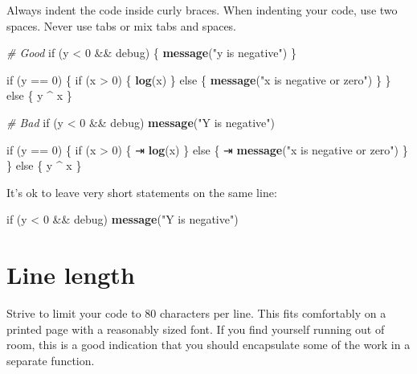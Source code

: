 \documentclass[]{book}
\newenvironment{Shaded}{\begin{snugshade}}{\end{snugshade}}
\newcommand{\KeywordTok}[1]{\textcolor[rgb]{0.13,0.29,0.53}{\textbf{{#1}}}}
\newcommand{\DecValTok}[1]{\textcolor[rgb]{0.00,0.00,0.81}{{#1}}}
\newcommand{\StringTok}[1]{\textcolor[rgb]{0.31,0.60,0.02}{{#1}}}
\newcommand{\CommentTok}[1]{\textcolor[rgb]{0.56,0.35,0.01}{\textit{{#1}}}}
\newcommand{\NormalTok}[1]{{#1}}
\begin{document}
Always indent the code inside curly braces. When indenting your code,
use two spaces. Never use tabs or mix tabs and spaces.

\begin{Shaded}
\begin{Highlighting}[]
\CommentTok{# Good}
\NormalTok{if (y <}\StringTok{ }\DecValTok{0} \NormalTok{&&}\StringTok{ }\NormalTok{debug) \{}
  \KeywordTok{message}\NormalTok{(}\StringTok{"y is negative"}\NormalTok{)}
\NormalTok{\}}

\NormalTok{if (y ==}\StringTok{ }\DecValTok{0}\NormalTok{) \{}
  \NormalTok{if (x >}\StringTok{ }\DecValTok{0}\NormalTok{) \{}
    \KeywordTok{log}\NormalTok{(x)}
  \NormalTok{\} else \{}
    \KeywordTok{message}\NormalTok{(}\StringTok{"x is negative or zero"}\NormalTok{)}
  \NormalTok{\}}
\NormalTok{\} else \{}
  \NormalTok{y ^}\StringTok{ }\NormalTok{x}
\NormalTok{\}}

\CommentTok{# Bad}
\NormalTok{if (y <}\StringTok{ }\DecValTok{0} \NormalTok{&&}\StringTok{ }\NormalTok{debug)}
\KeywordTok{message}\NormalTok{(}\StringTok{"Y is negative"}\NormalTok{)}

\NormalTok{if (y ==}\StringTok{ }\DecValTok{0}\NormalTok{)}
\NormalTok{\{}
    \NormalTok{if (x >}\StringTok{ }\DecValTok{0}\NormalTok{) \{}
\NormalTok{⇥       }\KeywordTok{log}\NormalTok{(x)}
    \NormalTok{\} else \{}
\NormalTok{⇥       }\KeywordTok{message}\NormalTok{(}\StringTok{"x is negative or zero"}\NormalTok{)}
    \NormalTok{\}}
\NormalTok{\} }
\NormalTok{else \{ y ^}\StringTok{ }\NormalTok{x \}}
\end{Highlighting}
\end{Shaded}

It's ok to leave very short statements on the same line:

\begin{Shaded}
\begin{Highlighting}[]
\NormalTok{if (y <}\StringTok{ }\DecValTok{0} \NormalTok{&&}\StringTok{ }\NormalTok{debug) }\KeywordTok{message}\NormalTok{(}\StringTok{"Y is negative"}\NormalTok{)}
\end{Highlighting}
\end{Shaded}

\section{Line length}\label{line-length}

Strive to limit your code to 80 characters per line. This fits
comfortably on a printed page with a reasonably sized font. If you find
yourself running out of room, this is a good indication that you should
encapsulate some of the work in a separate function.
\end{document}
